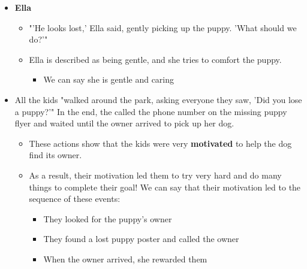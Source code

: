 \documentclass[12pt]{article}
\begin{document}
\begin{tcolorbox}[colframe=black!60, colback=white, 
coltitle=black, colbacktitle=black!15, fonttitle=\bfseries\Large, 
title=Examples, halign title=center, left=10pt, right=10pt, top=10pt, bottom=15pt]
\begin{itemize}
\begin{itemize}
    \end{itemize}
\item \textbf{Ella}
\begin{itemize}
    \item "'He looks lost,' Ella said, gently picking up the puppy. 'What should we do?'"
    \item Ella is described as being gentle, and she tries to comfort the puppy.
    \begin{itemize}
        \item We can say she is gentle and caring
    \end{itemize}
\end{itemize}
\item All the kids "walked around the park, asking everyone they saw, 'Did you lose a puppy?'" In the end, the called the phone number on the missing puppy flyer and waited until the owner arrived to pick up her dog.    
\begin{itemize}
    \item These actions show that the kids were very \textbf{motivated} to help the dog find its owner. 
    \item As a result, their motivation led them to try very hard and do many things to complete their goal! We can say that their motivation led to the sequence of these events:
    \begin{itemize}
        \item They looked for the puppy's owner
        \item They found a lost puppy poster and called the owner
        \item When the owner arrived, she rewarded them

    \end{itemize}
\end{itemize}


\end{itemize}



 





     \end{tcolorbox}
\end{document}
